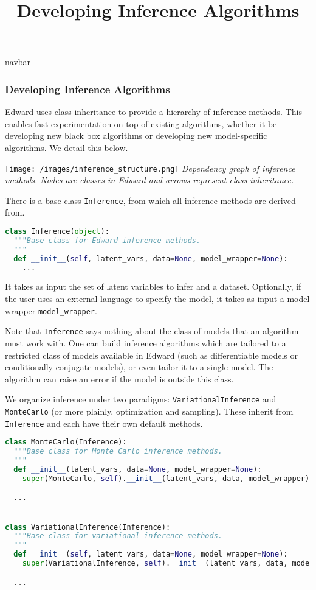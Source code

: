 \title{Developing Inference Algorithms}

{{navbar}}

\subsubsection{Developing Inference Algorithms}

Edward uses class inheritance to provide a hierarchy of inference
methods. This enables fast experimentation on top of existing
algorithms, whether it be developing new black box algorithms or developing new
model-specific algorithms.
We detail this below.

\texttt{[image: /images/inference\_structure.png]}
{\small\textit{Dependency graph of inference methods.
Nodes are classes in Edward and arrows represent class inheritance.}}

There is a base class \texttt{Inference}, from which all inference
methods are derived from.

\begin{lstlisting}[language=Python]
class Inference(object):
  """Base class for Edward inference methods.
  """
  def __init__(self, latent_vars, data=None, model_wrapper=None):
    ...
\end{lstlisting}

It takes as input the set of latent variables to infer and a dataset. Optionally, if the user uses an external language to specify the model, it takes as input a model wrapper \texttt{model_wrapper}.

Note that \texttt{Inference} says nothing about the class of models that an
algorithm must work with. One can build inference algorithms which are
tailored to a restricted class of models available in Edward (such as
differentiable models or conditionally conjugate models), or even
tailor it to a single model. The algorithm can raise an error if the
model is outside this class.

We organize inference under two paradigms:
\texttt{VariationalInference} and \texttt{MonteCarlo} (or more plainly,
optimization and sampling). These inherit from \texttt{Inference} and each
have their own default methods.

\begin{lstlisting}[language=Python]
class MonteCarlo(Inference):
  """Base class for Monte Carlo inference methods.
  """
  def __init__(latent_vars, data=None, model_wrapper=None):
    super(MonteCarlo, self).__init__(latent_vars, data, model_wrapper)

  ...


class VariationalInference(Inference):
  """Base class for variational inference methods.
  """
  def __init__(self, latent_vars, data=None, model_wrapper=None):
    super(VariationalInference, self).__init__(latent_vars, data, model_wrapper)

  ...
\end{lstlisting}

